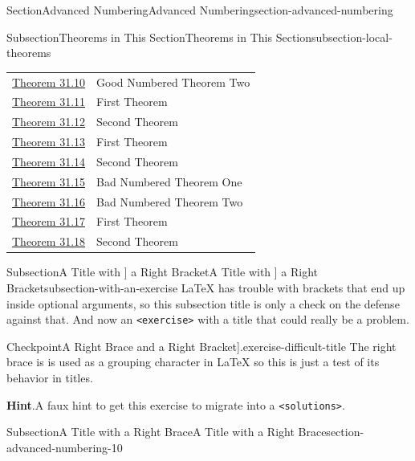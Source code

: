 \documentclass[twoside,10pt,]{article}
\newcommand{\blocktitlefont}{\relax}
\newcommand{\mono}[1]{\texttt{#1}}
\numberwithin{equation}{section}
\begin{document}
\begin{sectionptx}{Section}{Advanced Numbering}{}{Advanced Numbering}{}{}{section-advanced-numbering}
\begin{subsectionptx}{Subsection}{Theorems in This Section}{}{Theorems in This Section}{}{}{subsection-local-theorems}
\begin{longtable}[l]{ll}
\hyperref[theorem-good-two]{Theorem 31.10}& Good Numbered Theorem Two\\
\hyperref[theorem-number-09]{Theorem 31.11}& First Theorem\\
\hyperref[theorem-number-10]{Theorem 31.12}& Second Theorem\\
\hyperref[theorem-number-11]{Theorem 31.13}& First Theorem\\
\hyperref[theorem-number-12]{Theorem 31.14}& Second Theorem\\
\hyperref[theorem-bad-one]{Theorem 31.15}& Bad Numbered Theorem One\\
\hyperref[theorem-bad-two]{Theorem 31.16}& Bad Numbered Theorem Two\\
\hyperref[theorem-number-13]{Theorem 31.17}& First Theorem\\
\hyperref[theorem-number-14]{Theorem 31.18}& Second Theorem\\
\end{longtable}
\end{subsectionptx}
%
%
\typeout{************************************************}
\typeout{Subsection 31.7 A Title with ] a Right Bracket}
\typeout{************************************************}
%
\begin{subsectionptx}{Subsection}{A Title with ] a Right Bracket}{}{A Title with ] a Right Bracket}{}{}{subsection-with-an-exercise}
\LaTeX{} has trouble with brackets that end up inside optional arguments, so this subsection title is only a check on the defense against that.  And now an \mono{<exercise>} with a title that could really be a problem.%
\begin{inlineexercise}{Checkpoint}{A Right Brace \textbraceright{} and a Right Bracket].}{exercise-difficult-title}%
The right brace is is used as a grouping character in \LaTeX{} so this is just a test of its behavior in titles.%
\par\smallskip%
\noindent\textbf{\blocktitlefont Hint}.\hypertarget{exercise-difficult-title-3}{}\quad{}A faux hint to get this exercise to migrate into a \mono{<solutions>}.%
\end{inlineexercise}%
\end{subsectionptx}
%
%
\typeout{************************************************}
\typeout{************************************************}
%
\begin{subsectionptx}{Subsection}{A Title with \textbraceright{} a Right Brace}{}{A Title with \textbraceright{} a Right Brace}{}{}{section-advanced-numbering-10}

\end{subsectionptx}
\end{sectionptx}
\end{document}
